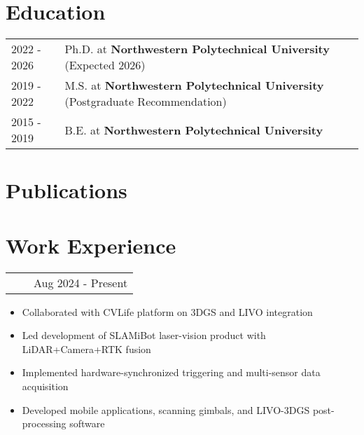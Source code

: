 \documentclass[a4paper,12pt]{article}
\makeatletter
\newenvironment{joblong}[2]
    {
    \begin{tabularx}{\linewidth}{@{}l X r@{}}
    \textbf{#1} & \hfill &  #2 \\[3.75pt]
    \end{tabularx}
    \begin{minipage}[t]{\linewidth}
    \begin{itemize}[nosep,after=\strut, leftmargin=1em, itemsep=3pt,label=--]
    }
    {
    \end{itemize}
    \end{minipage}    
    }
\makeatother
\begin{document}
\section{Education}
\begin{tabularx}{\linewidth}{@{}l X@{}}	
2022 - 2026 & Ph.D. at \textbf{Northwestern Polytechnical University} \hfill \normalsize (Expected 2026) \\

2019 - 2022 & M.S. at \textbf{Northwestern Polytechnical University} \hfill \normalsize (Postgraduate Recommendation) \\

2015 - 2019 & B.E. at \textbf{Northwestern Polytechnical University} \\
\end{tabularx}

\section{Publications}
\begin{refsection}
\nocite{coma2025,gaus2025,g2mapping2025,code2025,clusteraliv2025,curriculumloc2024,autofusion2024,hybridfusion2023,fasttree2023,rtsfm2021,svar2021,densefusion2020}
\printbibliography[heading=none]
\end{refsection}

\section{Work Experience}

\begin{joblong}{Technical Lead, \begin{CJK}{UTF8}{gbsn}上海司岚博科技有限公司\end{CJK}}{Aug 2024 - Present}
\item Collaborated with CVLife platform on 3DGS and LIVO integration
\item Led development of SLAMiBot laser-vision product with LiDAR+Camera+RTK fusion
\item Implemented hardware-synchronized triggering and multi-sensor data acquisition
\item Developed mobile applications, scanning gimbals, and LIVO-3DGS post-processing software
\end{joblong}
\end{document}
